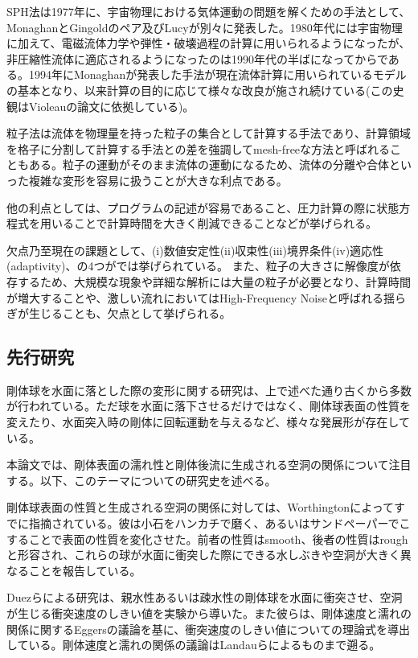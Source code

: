 \documentclass[]{jsarticle}
\begin{document}
SPH法は1977年に、宇宙物理における気体運動の問題を解くための手法として、MonaghanとGingoldのペア\cite{Gingold1977}及びLucy\cite{Lucy1977}が別々に発表した。1980年代には宇宙物理に加えて、電磁流体力学や弾性・破壊過程の計算に用いられるようになったが、非圧縮性流体に適応されるようになったのは1990年代の半ばになってからである。1994年にMonaghan\cite{Monaghan1994}が発表した手法が現在流体計算に用いられているモデルの基本となり、以来計算の目的に応じて様々な改良が施され続けている(この史観はVioleau\cite{Violeau2016}の論文に依拠している)。

粒子法は流体を物理量を持った粒子の集合として計算する手法であり、計算領域を格子に分割して計算する手法との差を強調してmesh-freeな方法と呼ばれることもある。粒子の運動がそのまま流体の運動になるため、流体の分離や合体といった複雑な変形を容易に扱うことが大きな利点である。

他の利点としては、プログラムの記述が容易であること、圧力計算の際に状態方程式を用いることで計算時間を大きく削減できることなどが挙げられる。

欠点乃至現在の課題として、(i)数値安定性(ii)収束性(iii)境界条件(iv)適応性(adaptivity)、の4つが\cite{Violeau2016}では挙げられている。
また、粒子の大きさに解像度が依存するため、大規模な現象や詳細な解析には大量の粒子が必要となり、計算時間が増大することや、激しい流れにおいてはHigh-Frequency Noiseと呼ばれる揺らぎが生じることも、欠点として挙げられる。

\subsection{先行研究}
剛体球を水面に落とした際の変形に関する研究は、上で述べた通り古くから多数が行われている。ただ球を水面に落下させるだけではなく、剛体球表面の性質を変えたり、水面突入時の剛体に回転運動を与えるなど、様々な発展形が存在している。

本論文では、剛体表面の濡れ性と剛体後流に生成される空洞の関係について注目する。以下、このテーマについての研究史を述べる。

剛体球表面の性質と生成される空洞の関係に対しては、Worthingtonによってすでに指摘されている\cite{Worthington1908}。彼は小石をハンカチで磨く、あるいはサンドペーパーでこすることで表面の性質を変化させた。前者の性質はsmooth、後者の性質はroughと形容され、これらの球が水面に衝突した際にできる水しぶきや空洞が大きく異なることを報告している。

Duez\cite{Duez2007}らによる研究は、親水性あるいは疎水性の剛体球を水面に衝突させ、空洞が生じる衝突速度のしきい値を実験から導いた。また彼らは、剛体速度と濡れの関係に関するEggers\cite{Eggers2004}の議論を基に、衝突速度のしきい値についての理論式を導出している。剛体速度と濡れの関係の議論はLandau\cite{landau1942}らによるものまで遡る。
\end{document}
